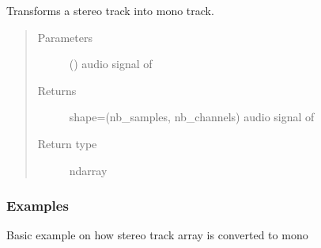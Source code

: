 \documentclass[letterpaper,10pt,english]{sphinxmanual}
\begin{document}
\begin{fulllineitems}
\label{\detokenize{docs/source/preprocess:preprocess.utility.to_mono}}
Transforms a stereo track into mono track.
\begin{quote}\begin{description}
\item[{Parameters}] \leavevmode
{} (\sphinxstyleliteralemphasis{\sphinxupquote{, }}\sphinxstyleliteralemphasis{\sphinxupquote{ (}}\sphinxstyleliteralemphasis{\sphinxupquote{, }}\sphinxstyleliteralemphasis{\sphinxupquote{)}}) \textendash{} audio signal of 

\item[{Returns}] \leavevmode
shape=(nb\_samples, nb\_channels)
audio signal of 

\item[{Return type}] \leavevmode
ndarray

\end{description}\end{quote}
\subsubsection*{Examples}

Basic example on how stereo track array is converted to mono

\begin{sphinxVerbatim}[commandchars=\\\{\}]
  \PYG{p}{[}\PYG{p}{[} \PYG{p}{]}\PYG{p}{[} \PYG{p}{]} \PYG{p}{[} \PYG{p}{]} \PYG{p}{[} \PYG{p}{]} \PYG{p}{[} \PYG{p}{]}\PYG{p}{]}
\PYG{g+go}{[[4.5]}
\PYG{g+go}{ [4. ]]}
\end{sphinxVerbatim}

\end{fulllineitems}
\end{document}
